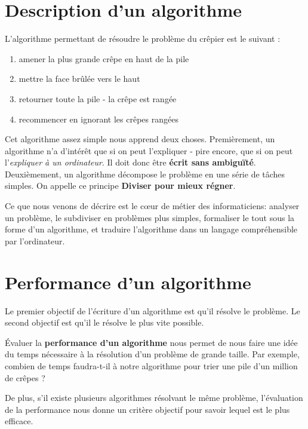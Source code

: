 \documentclass[a5paper,pagesize,DIV=14]{scrbook}
\begin{document}

\newpage

\section*{Description d'un algorithme}

L'algorithme permettant de résoudre le problème du crêpier est le suivant :

\begin{enumerate}
\item amener la plus grande crêpe en haut de la pile
\item mettre la face brûlée vers le haut
\item retourner toute la pile - la crêpe est rangée
\item recommencer en ignorant les crêpes rangées
\end{enumerate}

Cet algorithme assez simple nous apprend deux choses. Premièrement, un
algorithme n'a d'intérêt que si on peut l'expliquer - pire encore, que si on
peut l'\textit{expliquer à un ordinateur}. Il doit donc être \textbf{écrit sans
  ambiguïté}. Deuxièmement, un algorithme décompose le problème en une série de
tâches simples. On appelle ce principe \textbf{\og Diviser pour mieux
  régner\fg}.

Ce que nous venons de décrire est le c\oe{}ur de métier des informaticiens:
analyser un problème, le subdiviser en problèmes plus simples, formaliser le
tout sous la forme d'un algorithme, et traduire l'algorithme dans un langage
compréhensible par l'ordinateur.

\section*{Performance d'un algorithme}

Le premier objectif de l'écriture d'un algorithme est qu'il résolve le
problème. Le second objectif est qu'il le résolve le plus vite possible.

Évaluer la \textbf{performance d'un algorithme} nous permet de nous faire une
idée du temps nécessaire à la résolution d'un problème de grande taille. Par
exemple, combien de temps faudra-t-il à notre algorithme pour trier une pile
d'un million de crêpes ?

De plus, s'il existe plusieurs algorithmes résolvant le même problème,
l'évaluation de la performance nous donne un critère objectif pour savoir lequel
est le plus efficace.
\end{document}
